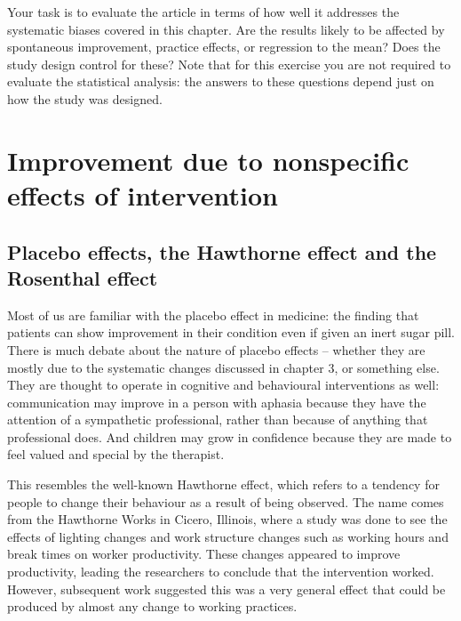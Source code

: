 \documentclass[]{book}
\begin{document}
Your task is to evaluate the article in terms of how well it addresses the systematic biases covered in this chapter. Are the results likely to be affected by spontaneous improvement, practice effects, or regression to the mean? Does the study design control for these? Note that for this exercise you are not required to evaluate the statistical analysis: the answers to these questions depend just on how the study was designed. 

\hypertarget{improvement-due-to-nonspecific-effects-of-intervention}{%
\chapter{Improvement due to nonspecific effects of intervention}\label{improvement-due-to-nonspecific-effects-of-intervention}}

\hypertarget{placebo-effects-the-hawthorne-effect-and-the-rosenthal-effect}{%
\section{Placebo effects, the Hawthorne effect and the Rosenthal effect}\label{placebo-effects-the-hawthorne-effect-and-the-rosenthal-effect}}

Most of us are familiar with the placebo effect in medicine: the finding that patients can show improvement in their condition even if given an inert sugar pill. There is much debate about the nature of placebo effects -- whether they are mostly due to the systematic changes discussed in chapter 3, or something else. They are thought to operate in cognitive and behavioural interventions as well: communication may improve in a person with aphasia because they have the attention of a sympathetic professional, rather than because of anything that professional does. And children may grow in confidence because they are made to feel valued and special by the therapist.

This resembles the well-known Hawthorne effect, which refers to a tendency for people to change their behaviour as a result of being observed. The name comes from the Hawthorne Works in Cicero, Illinois, where a study was done to see the effects of lighting changes and work structure changes such as working hours and break times on worker productivity. These changes appeared to improve productivity, leading the researchers to conclude that the intervention worked. However, subsequent work suggested this was a very general effect that could be produced by almost any change to working practices.
\end{document}
